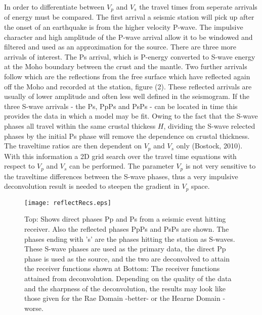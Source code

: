 \documentclass[jgrga]{agutex}
\begin{document}
\begin{article}
In order to differentiate between $V_p$ and $V_s$ the travel times from seperate arrivals of energy must be compared. The first arrival a seismic station will pick up after the onset of an earthquake is from the higher velocity P-wave. The impulsive character and high amplitude of the P-wave arrival allow it to be windowed and filtered and used as an approximation for the source. There are three more arrivals of interest. The Ps arrival, which is P-energy converted to S-wave energy at the Moho boundary between the crust and the mantle. Two further arrivals follow which are the reflections from the free surface which have reflected again off the Moho and recorded at the station, figure (2). These reflected arrivals are usually of lower amplitude and often less well defined in the seismogram. If the three S-wave arrivals - the Ps, PpPs and PsPs - can be located in time this provides the data in which a model may be fit. Owing to the fact that the S-wave phases all travel within the same crustal thickess $H$, dividing the S-wave relected phases by the initial Ps phase will remove the dependence on crustal thickness. The traveltime ratios are then dependent on $V_p$ and $V_s$ only (Bostock, 2010). With this information a 2D grid search over the travel time equations with respect to $V_p$ and $V_s$ can be performed. The parameter $V_p$ is not very sensitive to the traveltime differences between the S-wave phases, thus a very impulsive deconvolution result is needed to steepen the gradient in $V_p$ space. 


\begin{figure}
\noindent\texttt{[image: reflectRecs.eps]}
\caption{Top: Shows direct phases Pp and Ps from a seismic event hitting receiver. Also the reflected phases PpPs and PsPs are shown. The phases ending with 's' are the phases hitting the station as S-waves. These S-wave phases are used as the primary data, the direct Pp phase is used as the source, and the two are deconvolved to attain the receiver functions shown at Bottom: The receiver functions attained from deconvolution. Depending on the quality of the data and the sharpness of the deconvolution, the results may look like those given for the Rae Domain -better- or the Hearne Domain -worse.}
\end{figure}



\end{article}
\end{document}

